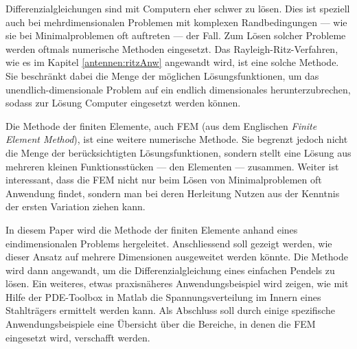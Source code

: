 %
%
%
%



Differenzialgleichungen sind mit Computern eher schwer zu lösen. 
Dies ist speziell auch bei mehrdimensionalen Problemen mit komplexen Randbedingungen --- wie sie bei Minimalproblemen oft auftreten --- der Fall. 
Zum Lösen solcher Probleme werden oftmals numerische Methoden eingesetzt. 
Das Rayleigh-Ritz-Verfahren, wie es im Kapitel \ref{antennen:ritzAnw} angewandt wird, ist eine solche Methode.
Sie beschränkt dabei die Menge der möglichen Lösungsfunktionen, um das unendlich-dimensionale Problem auf ein endlich dimensionales herunterzubrechen, sodass zur Lösung Computer eingesetzt werden können. 

Die Methode der finiten Elemente, auch FEM (aus dem Englischen {\em Finite Element Method}), ist eine weitere numerische Methode.
Sie begrenzt jedoch nicht die Menge der berücksichtigten Lösungsfunktionen, sondern stellt eine Lösung aus mehreren kleinen Funktionsstücken --- den Elementen --- zusammen.
Weiter ist interessant, dass die FEM nicht nur beim Lösen von Minimalproblemen oft Anwendung findet, sondern man bei deren Herleitung Nutzen aus der Kenntnis der ersten Variation ziehen kann. 

In diesem Paper wird die Methode der finiten Elemente anhand eines eindimensionalen Problems hergeleitet. 
Anschliessend soll gezeigt werden, wie dieser Ansatz auf mehrere Dimensionen ausgeweitet werden könnte. 
Die Methode wird dann angewandt, um die Differenzialgleichung eines einfachen Pendels zu lösen. 
Ein weiteres, etwas praxisnäheres Anwendungsbeispiel wird zeigen, wie mit Hilfe der PDE-Toolbox in Matlab die Spannungsverteilung im Innern eines Stahlträgers ermittelt werden kann. %
Als Abschluss soll durch einige spezifische Anwendungsbeispiele eine Übersicht über die Bereiche, in denen die FEM eingesetzt wird, verschafft werden.
